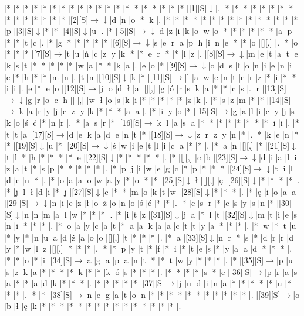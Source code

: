 \documentclass[11pt]{article}
\newcommand\drarr{$\rightarrow \!\!\!\!\! \downarrow$}
\newcommand\rarr{$\rightarrow$}
\newcommand\darr{$\downarrow$}
\begin{document}
\noindent\begin{Puzzle}{20}{33}|*	|*	|*	|*	|*	|*	|*	|*	|*	|*	|*	|*	|*	|*	|*	|*	|*	|*	|*	|*	|[1][S]\darr	|.
|*	|*	|*	|*	|*	|*	|*	|*	|*	|*	|*	|*	|*	|*	|*	|[2][S]\drarr	|d	|n	|o	|*	|k	|.
|*	|*	|*	|*	|*	|*	|*	|*	|*	|*	|*	|*	|*	|*	|*	|p	|[3][S]\darr	|*	|*	|[4][S]\darr	|u	|.
|*	|[5][S]\drarr	|d	|z	|i	|k	|o	|w	|o	|*	|*	|*	|*	|*	|*	|a	|p	|*	|*	|t	|c	|.
|*	|g	|*	|*	|*	|*	|*	|[6][S]\drarr	|s	|e	|r	|a	|p	|h	|i	|n	|e	|*	|*	|o	|[][,]{ }	|.
|*	|o	|*	|*	|*	|[7][S]\rarr	|t	|u	|ń	|c	|z	|y	|k	|*	|*	|e	|r	|*	|*	|l	|z	|.
|[8][S]\drarr	|m	|e	|t	|a	|t	|e	|k	|s	|t	|*	|*	|*	|*	|*	|w	|a	|*	|*	|k	|a	|.
|e	|o	|*	|[9][S]\drarr	|o	|d	|s	|ł	|o	|n	|i	|e	|n	|i	|e	|*	|h	|*	|*	|m	|n	|.
|t	|n	|[10][S]\darr	|k	|*	|[11][S]\rarr	|l	|a	|w	|e	|n	|t	|e	|r	|z	|*	|i	|*	|*	|i	|i	|.
|e	|*	|e	|o	|[12][S]\rarr	|j	|o	|d	|ł	|a	|[][,]{ }	|g	|ó	|r	|s	|k	|a	|*	|*	|c	|s	|.
|r	|[13][S]\drarr	|g	|r	|o	|c	|h	|[][,]{ }	|w	|ł	|o	|s	|k	|i	|*	|*	|*	|*	|*	|z	|k	|.
|*	|s	|z	|m	|*	|*	|[14][S]\rarr	|k	|a	|r	|y	|j	|c	|z	|y	|k	|*	|*	|*	|a	|a	|.
|*	|i	|y	|o	|*	|[15][S]\rarr	|g	|a	|l	|i	|c	|y	|j	|s	|k	|o	|ś	|ć	|*	|n	|r	|.
|*	|a	|s	|r	|*	|[16][S]\rarr	|k	|l	|a	|s	|a	|*	|*	|*	|*	|*	|*	|*	|*	|i	|i	|.
|*	|t	|t	|a	|[17][S]\rarr	|d	|e	|k	|a	|d	|e	|n	|t	|*	|[18][S]\drarr	|z	|r	|z	|y	|n	|*	|.
|*	|k	|e	|n	|*	|*	|[19][S]\darr	|u	|*	|[20][S]\drarr	|ś	|w	|i	|e	|t	|l	|i	|c	|a	|*	|*	|.
|*	|a	|n	|[][,]{ }	|*	|[21][S]\darr	|t	|l	|*	|h	|*	|*	|*	|*	|e	|[22][S]\darr	|*	|*	|*	|*	|*	|.
|*	|[][,]{ }	|c	|b	|[23][S]\drarr	|d	|i	|a	|l	|i	|z	|a	|t	|*	|s	|p	|*	|*	|*	|*	|*	|.
|*	|p	|j	|i	|w	|e	|g	|c	|*	|p	|*	|*	|*	|[24][S]\drarr	|t	|i	|l	|d	|e	|n	|*	|.
|*	|o	|a	|a	|o	|w	|a	|y	|*	|o	|*	|*	|[25][S]\darr	|ł	|[][,]{ }	|ę	|[26][S]\darr	|*	|*	|*	|*	|.
|*	|j	|l	|ł	|d	|i	|*	|j	|[27][S]\darr	|c	|*	|*	|m	|o	|k	|t	|w	|[28][S]\darr	|*	|*	|*	|.
|*	|ę	|i	|o	|a	|a	|[29][S]\drarr	|n	|i	|e	|z	|ł	|o	|ż	|o	|n	|o	|ś	|ć	|*	|*	|.
|*	|c	|s	|r	|*	|c	|s	|y	|s	|n	|*	|[30][S]\darr	|n	|n	|m	|a	|l	|w	|*	|*	|*	|.
|*	|i	|t	|z	|[31][S]\darr	|j	|a	|*	|l	|t	|[32][S]\darr	|m	|t	|i	|e	|s	|n	|i	|*	|*	|*	|.
|*	|o	|a	|y	|c	|a	|t	|*	|a	|a	|k	|a	|a	|c	|t	|t	|y	|a	|*	|*	|*	|.
|*	|w	|*	|t	|u	|*	|y	|*	|n	|u	|a	|d	|ż	|a	|o	|o	|[][,]{ }	|t	|*	|*	|*	|.
|*	|a	|[33][S]\darr	|n	|r	|*	|s	|*	|d	|r	|r	|d	|y	|*	|w	|l	|z	|[][,]{ }	|*	|*	|*	|.
|*	|*	|p	|y	|t	|*	|f	|*	|i	|*	|t	|e	|s	|*	|y	|a	|a	|d	|*	|*	|*	|.
|*	|*	|o	|*	|i	|[34][S]\rarr	|a	|g	|a	|p	|a	|n	|t	|*	|*	|t	|w	|y	|*	|*	|*	|.
|*	|[35][S]\rarr	|p	|u	|s	|z	|k	|a	|*	|*	|*	|*	|k	|*	|*	|k	|ó	|s	|*	|*	|*	|.
|*	|*	|*	|*	|s	|*	|c	|[36][S]\rarr	|p	|r	|a	|s	|a	|*	|*	|a	|d	|k	|*	|*	|*	|.
|*	|*	|*	|*	|*	|[37][S]\rarr	|j	|u	|d	|i	|n	|a	|*	|*	|*	|*	|*	|u	|*	|*	|*	|.
|*	|*	|[38][S]\rarr	|n	|e	|g	|a	|t	|o	|n	|*	|*	|*	|*	|*	|*	|*	|*	|*	|*	|*	|.
|[39][S]\rarr	|o	|b	|ł	|ę	|k	|*	|*	|*	|*	|*	|*	|*	|*	|*	|*	|*	|*	|*	|*	|*	|.\end{Puzzle}
\end{document}
